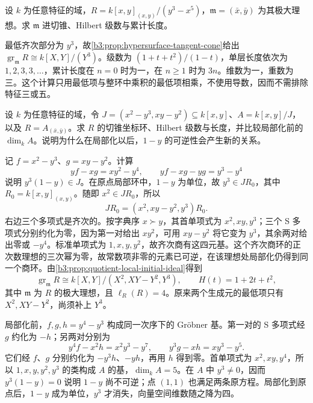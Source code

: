 \begin{exercise}\label{b3:ex:11-higher-cusp}
	设 \(k\) 为任意特征的域，\(R=k[x,y]_{(x,y)}/(y^3-x^5)\)，\(\mathfrak m=(\bar x,\bar y)\) 为其极大理想。求 \(\mathfrak m\) 进切锥、Hilbert 级数与累计长度。
\end{exercise}
\begin{solution}
	最低齐次部分为 \(y^3\)，故\cref{b3:prop:hypersurface-tangent-cone}给出 \(\operatorname{gr}_{\mathfrak m}R\cong k[X,Y]/(Y^3)\)。级数为 \((1+t+t^2)/(1-t)\)，单层长度依次为 \(1,2,3,3,\ldots\)，累计长度在 \(n=0\) 时为一，在 \(n\ge1\) 时为 \(3n\)。维数为一，重数为三。这个计算只用最低项与整环中乘积的最低项相乘，不使用导数，因而不需排除特征三或五。
\end{solution}

\begin{exercise}\label{b3:ex:11-extra-initial-relation}
	设 \(k\) 为任意特征的域，令 \(J=(x^2-y^3,xy-y^2)\subseteq k[x,y]\)、\(A=k[x,y]/J\)，以及 \(R=A_{(\bar x,\bar y)}\)。求 \(R\) 的切锥坐标环、Hilbert 级数与长度，并比较局部化前的 \(\dim_k A\)。说明为什么在局部化以后，\(1-y\) 的可逆性会产生新的关系。
\end{exercise}
\begin{solution}
	记 \(f=x^2-y^3\)、\(g=xy-y^2\)。计算
	\[
		yf-xg=xy^2-y^4, \qquad yf-xg-yg=y^3-y^4
	\]
	说明 \(y^3(1-y)\in J\)。在原点局部环中，\(1-y\) 为单位，故 \(y^3\in JR_0\)，其中 \(R_0=k[x,y]_{(x,y)}\)。随即 \(x^2\in JR_0\)，所以
	\[
		JR_0=(x^2,xy-y^2,y^3)R_0.
	\]
	右边三个多项式是齐次的。按字典序 \(x\succ y\)，其首单项式为 \(x^2,xy,y^3\)；三个 S 多项式分别约化为零，因为第一对给出 \(xy^2\)，可用 \(xy-y^2\) 将它变为 \(y^3\)，其余两对给出零或 \(-y^4\)。标准单项式为 \(1,x,y,y^2\)，故齐次商有这四元基。这个齐次商环的正次数理想的三次幂为零，故常数项非零的元素已可逆，在该理想处局部化仍得到同一个商环。由\cref{b3:prop:quotient-local-initial-ideal}得到
	\[
		\operatorname{gr}_{\mathfrak m}R\cong k[X,Y]/(X^2,XY-Y^2,Y^3), \qquad H(t)=1+2t+t^2,
	\]
	其中 \(\mathfrak m\) 为 \(R\) 的极大理想，且 \(\ell_R(R)=4\)。原来两个生成元的最低项只有 \(X^2,XY-Y^2\)，尚须补上 \(Y^3\)。

	局部化前，\(f,g,h=y^4-y^3\) 构成同一次序下的 Gröbner 基。第一对的 S 多项式经 \(g\) 约化为 \(-h\)；另两对分别为
	\[
		y^4f-x^2h=x^2y^3-y^7, \qquad y^3g-xh=xy^3-y^5.
	\]
	它们经 \(f\)、\(g\) 分别约化为 \(-y^3h\)、\(-yh\)，再用 \(h\) 得到零。首单项式为 \(x^2,xy,y^4\)，所以 \(1,x,y,y^2,y^3\) 的类构成 \(A\) 的基，\(\dim_k A=5\)。在 \(A\) 中 \(y^3\ne0\)，因而 \(y^3(1-y)=0\) 说明 \(1-y\) 尚不可逆；点 \((1,1)\) 也满足两条原方程。局部化到原点后，\(1-y\) 成为单位，\(y^3\) 才消失，向量空间维数随之降为四。
\end{solution}

